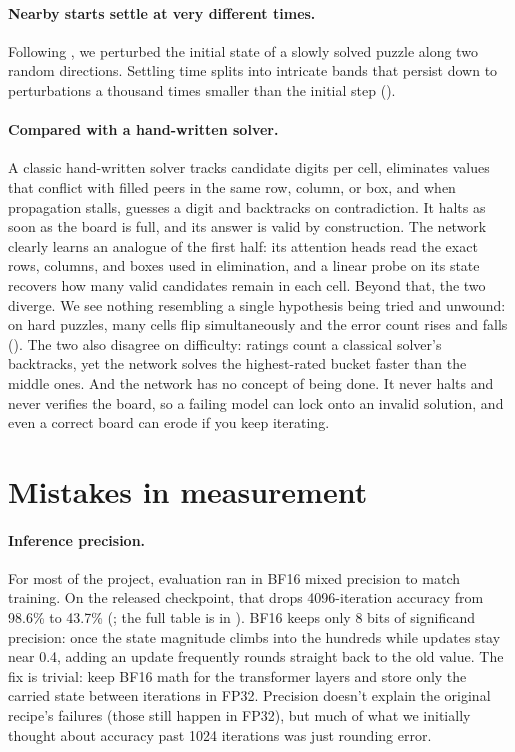 \paragraph{Nearby starts settle at very different times.} Following \citet{lai2026fractal}, we perturbed the initial state of a slowly solved puzzle along two random directions. Settling time splits into intricate bands that persist down to perturbations a thousand times smaller than the initial step ().

\paragraph{Compared with a hand-written solver.} A classic hand-written solver tracks candidate digits per cell, eliminates values that conflict with filled peers in the same row, column, or box, and when propagation stalls, guesses a digit and backtracks on contradiction. It halts as soon as the board is full, and its answer is valid by construction. The network clearly learns an analogue of the first half: its attention heads read the exact rows, columns, and boxes used in elimination, and a linear probe on its state recovers how many valid candidates remain in each cell. Beyond that, the two diverge. We see nothing resembling a single hypothesis being tried and unwound: on hard puzzles, many cells flip simultaneously and the error count rises and falls (). The two also disagree on difficulty: ratings count a classical solver's backtracks, yet the network solves the highest-rated bucket faster than the middle ones. And the network has no concept of being done. It never halts and never verifies the board, so a failing model can lock onto an invalid solution, and even a correct board can erode if you keep iterating.

\section{Mistakes in measurement}
\label{sec:pitfalls}

\paragraph{Inference precision.} For most of the project, evaluation ran in BF16 mixed precision to match training. On the released checkpoint, that drops 4096-iteration accuracy from 98.6\% to 43.7\% (; the full table is in ). BF16 keeps only 8 bits of significand precision: once the state magnitude climbs into the hundreds while updates stay near 0.4, adding an update frequently rounds straight back to the old value. The fix is trivial: keep BF16 math for the transformer layers and store only the carried state between iterations in FP32. Precision doesn't explain the original recipe's failures (those still happen in FP32), but much of what we initially thought about accuracy past 1024 iterations was just rounding error.


